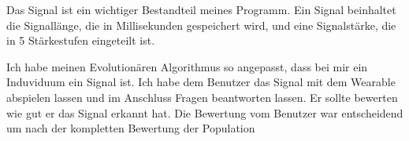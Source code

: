 

Das Signal ist ein wichtiger Bestandteil meines Programm. 
Ein Signal beinhaltet die Signall{\"a}nge, die in Millisekunden gespeichert wird, und eine Signalst{\"a}rke, die in 5 St{\"a}rkestufen eingeteilt ist. 



Ich habe meinen Evolution{\"a}ren Algorithmus so angepasst, dass bei mir ein Induviduum ein Signal ist. 
Ich habe dem Benutzer das Signal mit dem Wearable abspielen lassen und im Anschluss Fragen beantworten lassen. 
Er sollte bewerten wie gut er das Signal erkannt hat. Die Bewertung vom Benutzer war entscheidend um nach der kompletten Bewertung der Population 
